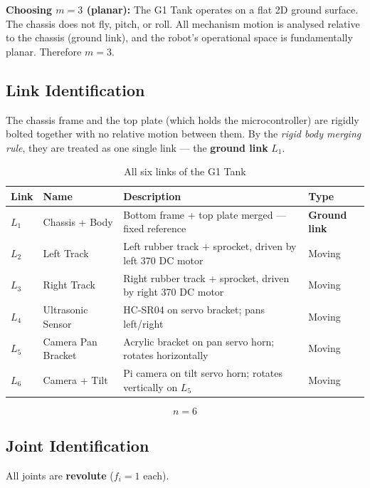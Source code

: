 \documentclass[12pt,a4paper]{article}
\begin{document}
\textbf{Choosing $m = 3$ (planar):} The G1 Tank operates on a flat 2D ground
surface. The chassis does not fly, pitch, or roll. All mechanism motion is
analysed relative to the chassis (ground link), and the robot's operational
space is fundamentally planar. Therefore $m = 3$.

\subsection{Link Identification}

The chassis frame and the top plate (which holds the microcontroller) are
rigidly bolted together with no relative motion between them. By the
\emph{rigid body merging rule}, they are treated as one single link --- the
\textbf{ground link} $L_1$.

\begin{table}[h!]
\centering
\caption{All six links of the G1 Tank}
\renewcommand{\arraystretch}{1.3}
\begin{tabularx}{\linewidth}{C{1cm} L{3.5cm} X L{2.5cm}}
\toprule
{}
\color{white}\textbf{Link} &
\color{white}\textbf{Name} &
\color{white}\textbf{Description} &
\color{white}\textbf{Type} \\
\midrule
$L_1$ & Chassis + Body & Bottom frame + top plate merged --- fixed reference & \textbf{Ground link} \\
$L_2$ & Left Track & Left rubber track + sprocket, driven by left 370 DC motor & Moving \\
$L_3$ & Right Track & Right rubber track + sprocket, driven by right 370 DC motor & Moving \\
$L_4$ & Ultrasonic Sensor & HC-SR04 on servo bracket; pans left/right & Moving \\
$L_5$ & Camera Pan Bracket & Acrylic bracket on pan servo horn; rotates horizontally & Moving \\
$L_6$ & Camera + Tilt & Pi camera on tilt servo horn; rotates vertically on $L_5$ & Moving \\
\bottomrule
\end{tabularx}
\end{table}

\[
  \boxed{n = 6}
\]

\subsection{Joint Identification}

All joints are \textbf{revolute} ($f_i = 1$ each).
\end{document}
